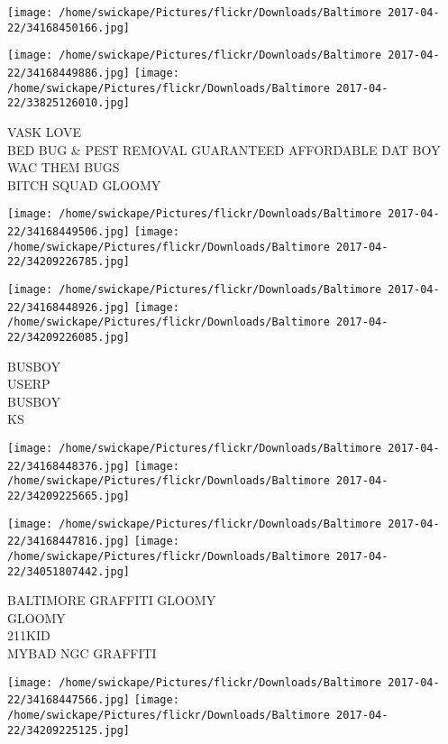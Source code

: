 \documentclass[10pt,letterpaper]{article}
\begin{document}
\texttt{[image: /home/swickape/Pictures/flickr/Downloads/Baltimore 2017-04-22/34168450166.jpg]}

\vspace{0.25in}
\texttt{[image: /home/swickape/Pictures/flickr/Downloads/Baltimore 2017-04-22/34168449886.jpg]}
\texttt{[image: /home/swickape/Pictures/flickr/Downloads/Baltimore 2017-04-22/33825126010.jpg]}

VASK LOVE\\
BED BUG \& PEST REMOVAL GUARANTEED AFFORDABLE DAT BOY WAC THEM BUGS\\
BITCH SQUAD GLOOMY\\
\pagebreak

\texttt{[image: /home/swickape/Pictures/flickr/Downloads/Baltimore 2017-04-22/34168449506.jpg]}
\texttt{[image: /home/swickape/Pictures/flickr/Downloads/Baltimore 2017-04-22/34209226785.jpg]}

\texttt{[image: /home/swickape/Pictures/flickr/Downloads/Baltimore 2017-04-22/34168448926.jpg]}
\texttt{[image: /home/swickape/Pictures/flickr/Downloads/Baltimore 2017-04-22/34209226085.jpg]}

BUSBOY\\
USERP\\
BUSBOY\\
KS\\
\pagebreak

\texttt{[image: /home/swickape/Pictures/flickr/Downloads/Baltimore 2017-04-22/34168448376.jpg]}
\texttt{[image: /home/swickape/Pictures/flickr/Downloads/Baltimore 2017-04-22/34209225665.jpg]}

\texttt{[image: /home/swickape/Pictures/flickr/Downloads/Baltimore 2017-04-22/34168447816.jpg]}
\texttt{[image: /home/swickape/Pictures/flickr/Downloads/Baltimore 2017-04-22/34051807442.jpg]}

BALTIMORE GRAFFITI GLOOMY\\
GLOOMY\\
211KID\\
MYBAD NGC GRAFFITI\\
\pagebreak

\texttt{[image: /home/swickape/Pictures/flickr/Downloads/Baltimore 2017-04-22/34168447566.jpg]}
\texttt{[image: /home/swickape/Pictures/flickr/Downloads/Baltimore 2017-04-22/34209225125.jpg]}
\end{document}
